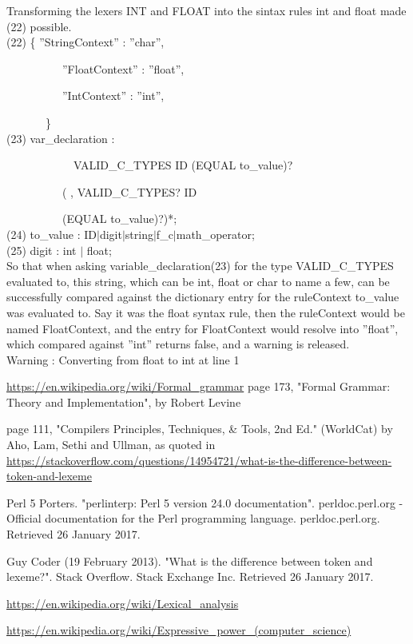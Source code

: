 \documentclass[twocolumn,10ptr]{article}
\begin{document}
Transforming the lexers INT and FLOAT into the sintax rules int and float made (22) possible.\\
 
 (22)
\{  ''StringContext'' : ''char'',

\ \ \ \ \ \ \ \ \ \   ''FloatContext'' : ''float'',

\ \ \ \ \ \ \ \ \ \   ''IntContext'' : ''int'',  

 \ \ \ \ \ \ \    \}\\
 
 
(23) var\_declaration : 

\ \ \ \ \ \ \ \ \ \ \ \  VALID\_C\_TYPES ID (EQUAL to\_value)?

\ \ \ \ \ \ \ \ \ \    (\textsc{} ,\textsc{}  VALID\_C\_TYPES? ID 

\ \ \ \ \ \ \ \ \ \   (EQUAL to\_value)?)*;\\
(24) to\_value : ID\(\mid\)digit\(\mid\)string\(\mid\)f\_c\(\mid\)math\_operator;\\
(25) digit : int \(\mid\) float;\\

So that when asking variable\_declaration(23) for the type VALID\_C\_TYPES evaluated to, this string, which can be \textsc{}int\textsc{}, \textsc{}float\textsc{} or \textsc{}char\textsc{} to name a few, can be successfully compared against the dictionary entry for the ruleContext to\_value was evaluated to. Say it was the float syntax rule, then the ruleContext would be named FloatContext, and the entry for FloatContext would resolve into  ''float'', which compared against  ''int'' returns false, and a warning is released.\\

Warning : Converting from float to int at line 1\\

\onecolumn
\begin{thebibliography}{9}
 \url{https://en.wikipedia.org/wiki/Formal_grammar}
page 173, "Formal Grammar: Theory and Implementation", by Robert Levine

page 111, "Compilers Principles, Techniques, \& Tools, 2nd Ed." (WorldCat) by Aho, Lam, Sethi and Ullman, as quoted in \url{https://stackoverflow.com/questions/14954721/what-is-the-difference-between-token-and-lexeme}  

Perl 5 Porters. "perlinterp: Perl 5 version 24.0 documentation". perldoc.perl.org - Official documentation for the Perl programming language. perldoc.perl.org. Retrieved 26 January 2017.

Guy Coder (19 February 2013). "What is the difference between token and lexeme?". Stack Overflow. Stack Exchange Inc. Retrieved 26 January 2017.

 \url{https://en.wikipedia.org/wiki/Lexical_analysis}
 
 \url{https://en.wikipedia.org/wiki/Expressive_power_(computer_science)}


\end{thebibliography}
 
\end{document}
